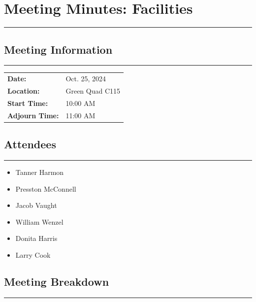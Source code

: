 \documentclass[12pt]{article}
\begin{document}





\newpage
\section*{Meeting Minutes: Facilities}
\vspace{-1.3em}
\rule{\textwidth}{2pt}

\subsection*{Meeting Information}
\vspace{-1.3em}
\rule{\textwidth}{1pt}
\begin{tabular}{@{}ll@{}}
    \textbf{Date:} & Oct. 25, 2024 \\
    \textbf{Location:} & Green Quad C115 \\
    \textbf{Start Time:} & 10:00 AM \\
    \textbf{Adjourn Time:} & 11:00 AM \\
\end{tabular}

\subsection*{Attendees}
\vspace{-1.3em}
\rule{\textwidth}{1pt}
\begin{itemize}[noitemsep, topsep=0pt]
    \item Tanner Harmon
    \item Presston McConnell
    \item Jacob Vaught
    \item William Wenzel
    \item Donita Harris
    \item Larry Cook
\end{itemize}

\subsection*{Meeting Breakdown}
\vspace{-1.3em}
\rule{\textwidth}{1pt}
\vspace{-2.3em}
\end{document}
